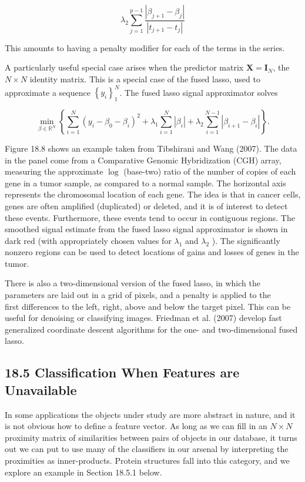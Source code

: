 \documentclass[10pt]{article}
\begin{document}
\begin{equation*}
\lambda_{2} \sum_{j=1}^{p-1} \frac{\left|\beta_{j+1}-\beta_{j}\right|}{\left|t_{j+1}-t_{j}\right|} \tag{18.23}
\end{equation*}


This amounts to having a penalty modifier for each of the terms in the series.

A particularly useful special case arises when the predictor matrix $\mathbf{X}= \mathbf{I}_{N}$, the $N \times N$ identity matrix. This is a special case of the fused lasso, used to approximate a sequence $\left\{y_{i}\right\}_{1}^{N}$. The fused lasso signal approximator solves


\begin{equation*}
\min _{\beta \in \mathbb{R}^{N}}\left\{\sum_{i=1}^{N}\left(y_{i}-\beta_{0}-\beta_{i}\right)^{2}+\lambda_{1} \sum_{i=1}^{N}\left|\beta_{i}\right|+\lambda_{2} \sum_{i=1}^{N-1}\left|\beta_{i+1}-\beta_{i}\right|\right\} . \tag{18.24}
\end{equation*}


Figure 18.8 shows an example taken from Tibshirani and Wang (2007). The data in the panel come from a Comparative Genomic Hybridization (CGH) array, measuring the approximate $\log$ (base-two) ratio of the number of copies of each gene in a tumor sample, as compared to a normal sample. The horizontal axis represents the chromosomal location of each gene. The idea is that in cancer cells, genes are often amplified (duplicated) or deleted, and it is of interest to detect these events. Furthermore, these events tend to occur in contiguous regions. The smoothed signal estimate from the fused lasso signal approximator is shown in dark red (with appropriately chosen values for $\lambda_{1}$ and $\lambda_{2}$ ). The significantly nonzero regions can be used to detect locations of gains and losses of genes in the tumor.

There is also a two-dimensional version of the fused lasso, in which the parameters are laid out in a grid of pixels, and a penalty is applied to the\\
first differences to the left, right, above and below the target pixel. This can be useful for denoising or classifying images. Friedman et al. (2007) develop fast generalized coordinate descent algorithms for the one- and two-dimensional fused lasso.

\subsection*{18.5 Classification When Features are Unavailable}
In some applications the objects under study are more abstract in nature, and it is not obvious how to define a feature vector. As long as we can fill in an $N \times N$ proximity matrix of similarities between pairs of objects in our database, it turns out we can put to use many of the classifiers in our arsenal by interpreting the proximities as inner-products. Protein structures fall into this category, and we explore an example in Section 18.5.1 below.
\end{document}
